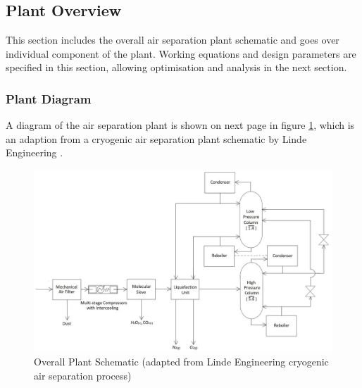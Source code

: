 \subsection{Plant Overview} \noindent
This section includes the overall air separation plant schematic and goes over individual component of the plant. Working equations and design parameters are specified in this section, allowing optimisation and analysis in the next section.
	\subsubsection{Plant Diagram} \noindent
    A diagram of the air separation plant is shown on next page in figure \ref{plant_diagram}, which is an adaption from a cryogenic air separation plant schematic by Linde Engineering \cite{linde_cryo}.
    \begin{figure}
        \centering
	    \includegraphics[width=\linewidth]{plant_diagram.jpg}
        \caption{Overall Plant Schematic (adapted from Linde Engineering cryogenic air separation process)}
	    \label{plant_diagram}
    \end{figure}
